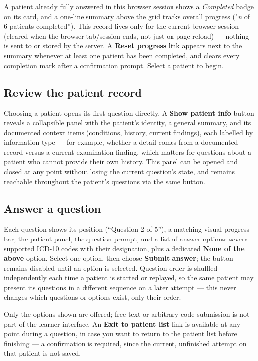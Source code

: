 \documentclass[11pt,a4paper]{article}
\begin{document}
A patient already fully answered in this browser session shows a
\textit{Completed} badge on its card, and a one-line summary above the
grid tracks overall progress ("\textit{n} of 6 patients completed''). This
record lives only for the current browser session (cleared when the
browser tab/session ends, not just on page reload) --- nothing is sent to
or stored by the server. A \textbf{Reset progress} link appears next to the
summary whenever at least one patient has been completed, and clears every
completion mark after a confirmation prompt. Select a patient to begin.

\subsection{Review the patient record}

Choosing a patient opens its first question directly. A \textbf{Show
patient info} button reveals a collapsible panel with the patient's
identity, a general summary, and its documented context items (conditions,
history, current findings), each labelled by information type --- for
example, whether a detail comes from a documented record versus a current
examination finding, which matters for questions about a patient who
cannot provide their own history. This panel can be opened and closed at
any point without losing the current question's state, and remains
reachable throughout the patient's questions via the same button.

\subsection{Answer a question}

Each question shows its position (``Question 2 of 5''), a matching visual
progress bar, the patient panel, the question prompt, and a list of
answer options: several supported ICD-10 codes with their designation,
plus a dedicated \textbf{None of the above} option. Select one option, then
choose \textbf{Submit answer}; the button remains disabled until an option
is selected. Question order is shuffled independently each time a patient
is started or replayed, so the same patient may present its questions in a
different sequence on a later attempt --- this never changes which
questions or options exist, only their order.

Only the options shown are offered; free-text or arbitrary code submission
is not part of the learner interface. An \textbf{Exit to patient list}
link is available at any point during a question, in case you want to
return to the patient list before finishing --- a confirmation is required,
since the current, unfinished attempt on that patient is not saved.
\end{document}
